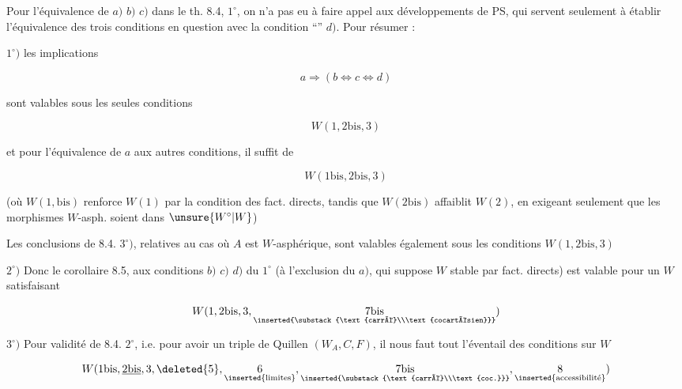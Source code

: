 
Pour l'équivalence de $a)$ $b)$ $c)$ dans le th. 8.4, $1^\circ$, on n'a  pas eu à faire appel aux  développements de PS, qui servent  seulement à établir l'équivalence des trois conditions en question avec la condition ``'' $d)$. Pour résumer :

$1^\circ)$ les implications

\[
a\Rightarrow(b\Leftrightarrow c\Leftrightarrow d)
\]

sont valables sous les seules conditions

\[
W(1,2\mathrm{bis},3)
\]

et  pour l'équivalence de $a$ aux autres conditions, il suffit de

\[
W(1\mathrm{bis},2\mathrm{bis},3)
\]

(où $W(1,\mathrm{bis})$ renforce $W(1)$ par la condition des fact. directs, tandis que $W(2\mathrm{bis})$ affaiblit $W(2)$, en exigeant seulement que les morphismes $W$-asph. soient dans $\unsure{W^{\circ}|W}$)

 Les conclusions de 8.4. $3^\circ)$, relatives au cas où $A$ est $W$-asphérique, sont valables également sous les conditions $W(1,2\mathrm{bis},3)$

$2^\circ)$ Donc le corollaire 8.5,   aux conditions $b)$ $c)$ $d)$ du $1^\circ$ (à l'exclusion du $a)$, qui suppose $W$ stable par fact. directs) est valable pour un $W$ satisfaisant

\[
W(1,2\mathrm{bis},3,\underset{\inserted{\substack{\text{carré}\\\text{cocartésien}}}}{7\mathrm{bis}})
\]

$3^\circ)$ Pour  validité de 8.4. $2^\circ$, i.e. pour avoir un triple de Quillen $(W_A,C,F)$, il nous faut  tout l'éventail des conditions sur $W$

\[
W(1\mathrm{bis},\underline{2\mathrm{bis}},3,\deleted{5},\underset{\inserted{\text{limites}}}{6},
\underset{\inserted{\substack{\text{carré}\\\text{coc.}}}}{7\mathrm{bis}},
\underset{\inserted{\text{accessibilité}}}{8})
\]


